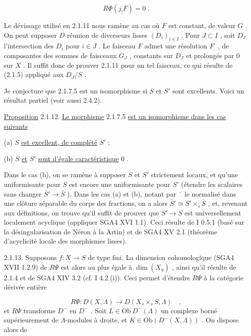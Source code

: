 \begin{equation*}
R\Phi(j_! F) = 0 \;.
\end{equation*}


Le dévissage utilisé en 2.1.11 nous ramène au cas où $F$ est constant, de valeur $G$ . On peut supposer $D$ réunion de diverseurs lisses $(D_i)_{i \in I}$ . Pour $J \subset I$ , soit $D_J$ l'intersection des $D_i$ pour $i \in J$ . Le faisceau $F$ admet une résolution $F^{\cdot}$ , de composantes des sommes de faisceaux $G_J$ , constants sur $D_J$ et prolongés par $0$ sur $X$ . Il suffit donc de prouver 2.1.11 pour un tel faisceau, ce qui résulte de (2.1.5) appliqué aux $D_J/S$ .

Je conjecture que 2.1.7.5 est un isomorphisme si $S$ et $S'$ sont excellents. Voici un résultat partiel (voir aussi 2.4.2).

\underline{Proposition} 2.1.12. \underline{Le morphisme} 2.1.7.5 \underline{est un isomorphisme dans les cas suivants}

(a) $S$ \underline{est excellent, de complété} $S'$ ;

(b) $S$ \underline{et} $S'$ \underline{sont d'égale caractéristique} $0$ .

Dans le cas (b), on se ramène à supposer $S$ et $S'$ strictement locaux, et qu'une uniformisante pour $S$ est encore une uniformisante pour $S'$ (étendre les scalaires sans changer $\bar{S}' \to \bar{S}$ ). Dans les cas (a) et (b), notant par $\bar{\phantom{x}}$ le normalisé dans une clôture séparable du corps des fractions, on a alors $\bar{S}' \simeq S' \times_s \bar{S}$ , et, revenant aux définitions, on trouve qu'il suffit de prouver que $S' \to S$ est universellement localement acyclique (appliquer SGA4 XVI 1.1). Ceci résulte de I 0.5.1 (basé sur la désingularisation de Néron à la Artin) et de SGA4 XV 2.1 (théorème d'acyclicité locale des morphismes lisses).

2.1.13. Supposons $f : X \to S$ de type fini. La dimension cohomologique (SGA4 XVII 1.2.9) de $R\Psi$ est alors au plus égale à $\dim(X_\eta)$ , ainsi qu'il résulte de 2.1.4 et de SGA4 XIV 3.2 (cf. I 4.2.(i)). Ceci permet d'étendre $R\Psi$ à la catégorie dérivée entière

\begin{equation*}
R\Psi : D(X, \Lambda) \longrightarrow D(X_s \times_s S, \Lambda) \quad ,
\end{equation*}
et $R\Psi$ transforme $D^-$ en $D^-$ . Soit $L \in \mathrm{Ob}\ D^-(\Lambda)$ un complexe borné supérieurement de $\Lambda$-modules à droite, et $K \in \mathrm{Ob}(D^-(X, \Lambda))$ . On dispose alors de 


